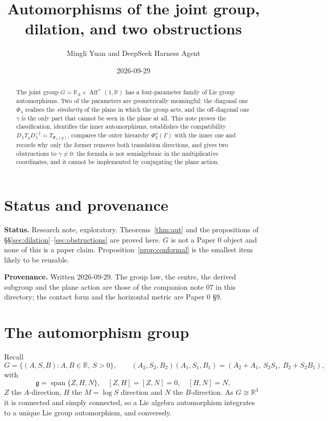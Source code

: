 \documentclass[11pt]{article}
\title{Automorphisms of the joint group, dilation, and two obstructions}
\author{Mingli Yuan and DeepSeek Harness Agent}
\date{2026-09-29}
\begin{document}
\maketitle

\begin{abstract}
The joint group $G=\mathbb R_A\times\operatorname{Aff}^+(1,\mathbb R)$ has a
four-parameter family of Lie group automorphisms. Two of the parameters are
geometrically meaningful: the diagonal one $\Phi_\lambda$ realises the
\emph{similarity} of the plane in which the group acts, and the off-diagonal one
$\gamma$ is the only part that cannot be seen in the plane at all. This note
proves the classification, identifies the inner automorphisms, establishes the
compatibility $D_\lambda T_gD_\lambda^{-1}=T_{\Phi_\lambda(g)}$, compares the
outer hierarchy $\Phi_2^n(\Gamma)$ with the inner one and records why only the
former removes both translation directions, and gives two obstructions to
$\gamma\ne0$: the formula is not semialgebraic in the multiplicative coordinates,
and it cannot be implemented by conjugating the plane action.
\end{abstract}

\tableofcontents

\section{Status and provenance}
\label{sec:status}

\textbf{Status.} Research note, exploratory. Theorems~\ref{thm:aut} and the
propositions of \S\S\ref{sec:dilation}--\ref{sec:obstructions} are proved here.
$G$ is not a Paper 0 object and none of this is a paper claim.
Proposition~\ref{prop:conformal} is the smallest item likely to be reusable.

\textbf{Provenance.} Written 2026-09-29. The group law, the centre, the derived
subgroup and the plane action are those of the companion note 07 in this
directory; the contact form and the horizontal metric are Paper 0 \S9.

\section{The automorphism group}
\label{sec:aut}

Recall
\[
G=\{(A,S,B):A,B\in\mathbb R,\ S>0\},\qquad
(A_2,S_2,B_2)(A_1,S_1,B_1)=(A_2+A_1,\ S_2S_1,\ B_2+S_2B_1),
\]
with
\[
\mathfrak g=\operatorname{span}\{Z,H,N\},\quad
[Z,H]=[Z,N]=0,\quad [H,N]=N,
\]
$Z$ the $A$-direction, $H$ the $M=\log S$ direction and $N$ the $B$-direction.
As $G\cong\mathbb R^3$ it is connected and simply connected, so a Lie algebra
automorphism integrates to a unique Lie group automorphism, and conversely.
\end{document}
